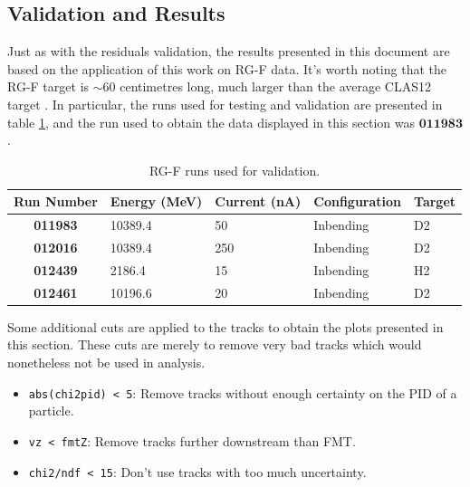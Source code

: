 \subsection{Validation and Results} \label{ssec::validationandresults}
    Just as with the residuals validation, the results presented in this document are based on the application of this work on RG-F data.
    It's worth noting that the RG-F target is $\sim60$ centimetres long, much larger than the average CLAS12 target \cite{hattawy2019}.
    In particular, the runs used for testing and validation are presented in table \ref{tab::rgf_data}, and the run used to obtain the data displayed in this section was $\mathbf{011983}$.

    \begin{table}[h!]
        \centering
        \begin{tabular}{c|llll}
            \textbf{Run Number} & \textbf{Energy (MeV)} & \textbf{Current (nA)} & \textbf{Configuration} & \textbf{Target} \\
            \hline
            \textbf{011983}     & 10389.4 &  50 & Inbending & D2 \\
            \textbf{012016}     & 10389.4 & 250 & Inbending & D2 \\
            \textbf{012439}     &  2186.4 &  15 & Inbending & H2 \\
            \textbf{012461}     & 10196.6 &  20 & Inbending & D2
        \end{tabular}
        \caption{RG-F runs used for validation.}
        \label{tab::rgf_data}
    \end{table}

    Some additional cuts are applied to the tracks to obtain the plots presented in this section.
    These cuts are merely to remove very bad tracks which would nonetheless not be used in analysis.
    \begin{itemize}
        \item \texttt{abs(chi2pid) < 5}: Remove tracks without enough certainty on the PID of a particle.
        \item \texttt{vz < fmtZ}: Remove tracks further downstream than FMT.
        \item \texttt{chi2/ndf < 15}: Don't use tracks with too much uncertainty.
    \end{itemize}

